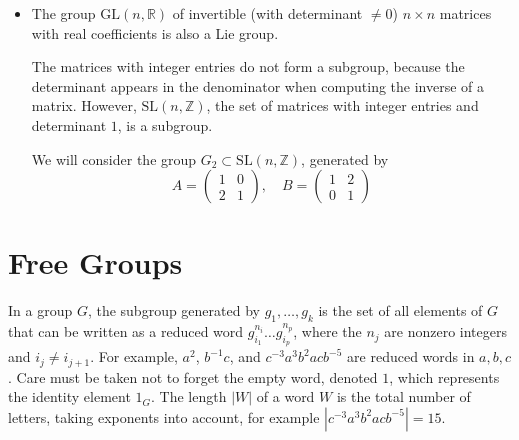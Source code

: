 \documentclass{amsart}
\def\sltwo{\ensuremath{\mathrm{SL}(n,\mathbb{Z})}}
\begin{document}
\begin{itemize}
\item The group $\mathrm{GL}(n, \mathbb{R})$ of invertible (with
  determinant $\neq 0$)
  $n \times n$ matrices with real coefficients is also a Lie group.
  
  The matrices with integer entries do not form a subgroup, because
  the determinant appears in the denominator when computing the
  inverse of a matrix.
  However, \sltwo, the set of matrices with
  integer entries and determinant $1$, is a subgroup.

  We will consider the group $G_2 \subset \sltwo$,
  generated by
  \[
    A=\begin{pmatrix}1&0\\2&1\end{pmatrix},\quad
    B=\begin{pmatrix}1&2\\0&1\end{pmatrix}
  \]
\end{itemize}

\section{Free Groups}


In a group $G$, the subgroup generated by ${g_1, \dots, g_k}$ is the
set of all elements of $G$ that can be written as a reduced word
$g_{i_{1}}^{n_{i}}\dots g_{i_{p}}^{n_{p}}$, where the $n_j$ are
nonzero integers and $i_j \neq i_{j+1}$.  For example, $a^2$,
$b^{-1}c$, and $c^{-3}a^3b^2acb^{-5}$ are reduced words in $a, b, c$.
Care must be taken not to forget the empty word, denoted $1$, which
represents the identity element $1_G$.  The length $|W|$ of a word $W$
is the total number of letters, taking exponents into account, for
example $|c^{-3}a^{3}b^{2}acb^{-5}|=15$.
\end{document}
